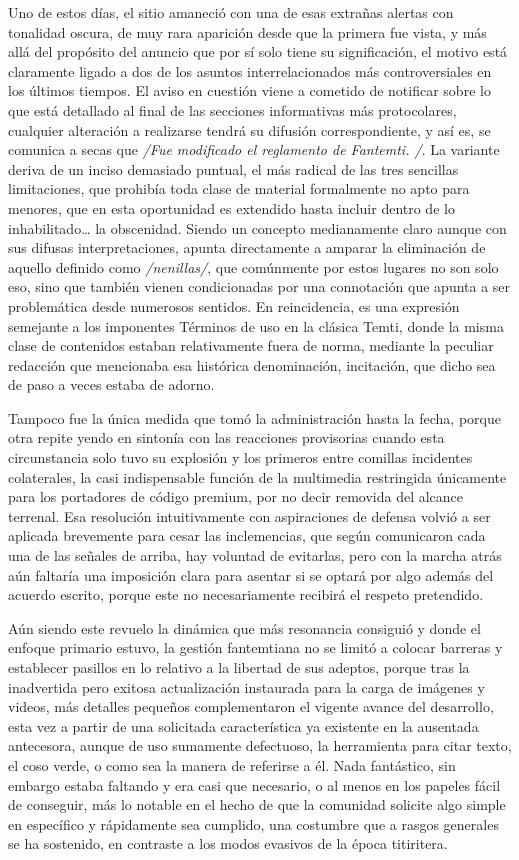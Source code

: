 \documentclass[
]{book}
\begin{document}
Uno de estos días, el sitio amaneció con una de esas extrañas alertas con tonalidad oscura, de muy rara aparición desde que la primera fue vista, y más allá del propósito del anuncio que por sí solo tiene su significación, el motivo está claramente ligado a dos de los asuntos interrelacionados más controversiales en los últimos tiempos. El aviso en cuestión viene a cometido de notificar sobre lo que está detallado al final de las secciones informativas más protocolares, cualquier alteración a realizarse tendrá su difusión correspondiente, y así es, se comunica a secas que \emph{/Fue modificado el reglamento de Fantemti. /}. La variante deriva de un inciso demasiado puntual, el más radical de las tres sencillas limitaciones, que prohibía toda clase de material formalmente no apto para menores, que en esta oportunidad es extendido hasta incluir dentro de lo inhabilitado\ldots{} la obscenidad. Siendo un concepto medianamente claro aunque con sus difusas interpretaciones, apunta directamente a amparar la eliminación de aquello definido como \emph{/nenillas/}, que comúnmente por estos lugares no son solo eso, sino que también vienen condicionadas por una connotación que apunta a ser problemática desde numerosos sentidos. En reincidencia, es una expresión semejante a los imponentes Términos de uso en la clásica Temti, donde la misma clase de contenidos estaban relativamente fuera de norma, mediante la peculiar redacción que mencionaba esa histórica denominación, incitación, que dicho sea de paso a veces estaba de adorno.

Tampoco fue la única medida que tomó la administración hasta la fecha, porque otra repite yendo en sintonía con las reacciones provisorias cuando esta circunstancia solo tuvo su explosión y los primeros entre comillas incidentes colaterales, la casi indispensable función de la multimedia restringida únicamente para los portadores de código premium, por no decir removida del alcance terrenal. Esa resolución intuitivamente con aspiraciones de defensa volvió a ser aplicada brevemente para cesar las inclemencias, que según comunicaron cada una de las señales de arriba, hay voluntad de evitarlas, pero con la marcha atrás aún faltaría una imposición clara para asentar si se optará por algo además del acuerdo escrito, porque este no necesariamente recibirá el respeto pretendido.

Aún siendo este revuelo la dinámica que más resonancia consiguió y donde el enfoque primario estuvo, la gestión fantemtiana no se limitó a colocar barreras y establecer pasillos en lo relativo a la libertad de sus adeptos, porque tras la inadvertida pero exitosa actualización instaurada para la carga de imágenes y videos, más detalles pequeños complementaron el vigente avance del desarrollo, esta vez a partir de una solicitada característica ya existente en la ausentada antecesora, aunque de uso sumamente defectuoso, la herramienta para citar texto, el coso verde, o como sea la manera de referirse a él. Nada fantástico, sin embargo estaba faltando y era casi que necesario, o al menos en los papeles fácil de conseguir, más lo notable en el hecho de que la comunidad solicite algo simple en específico y rápidamente sea cumplido, una costumbre que a rasgos generales se ha sostenido, en contraste a los modos evasivos de la época titiritera.
\end{document}
